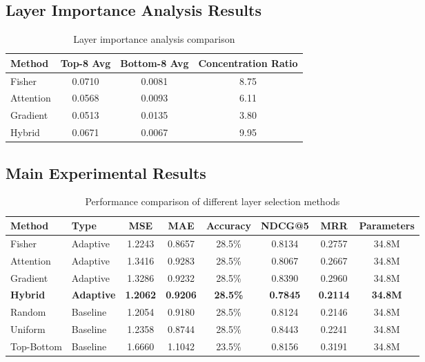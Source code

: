 \documentclass[sigconf]{acmart}
\begin{document}
\subsection{Layer Importance Analysis Results}

\begin{table}[htbp]
\centering
\caption{Layer importance analysis comparison}
\begin{tabular}{lccc}
\toprule
Method & Top-8 Avg & Bottom-8 Avg & Concentration Ratio \\
\midrule
Fisher & 0.0710 & 0.0081 & 8.75 \\
Attention & 0.0568 & 0.0093 & 6.11 \\
Gradient & 0.0513 & 0.0135 & 3.80 \\
Hybrid & 0.0671 & 0.0067 & 9.95 \\
\bottomrule
\end{tabular}
\label{tab:layer_importance}
\end{table}

\subsection{Main Experimental Results}

\begin{table*}[htbp]
\centering
\caption{Performance comparison of different layer selection methods}
\begin{tabular}{llcccccc}
\toprule
Method & Type & MSE & MAE & Accuracy & NDCG@5 & MRR & Parameters \\
\midrule
Fisher & Adaptive & 1.2243 & 0.8657 & 28.5\% & 0.8134 & 0.2757 & 34.8M \\
Attention & Adaptive & 1.3416 & 0.9283 & 28.5\% & 0.8067 & 0.2667 & 34.8M \\
Gradient & Adaptive & 1.3286 & 0.9232 & 28.5\% & 0.8390 & 0.2960 & 34.8M \\
\textbf{Hybrid} & \textbf{Adaptive} & \textbf{1.2062} & \textbf{0.9206} & \textbf{28.5\%} & \textbf{0.7845} & \textbf{0.2114} & \textbf{34.8M} \\
Random & Baseline & 1.2054 & 0.9180 & 28.5\% & 0.8124 & 0.2146 & 34.8M \\
Uniform & Baseline & 1.2358 & 0.8744 & 28.5\% & 0.8443 & 0.2241 & 34.8M \\
Top-Bottom & Baseline & 1.6660 & 1.1042 & 23.5\% & 0.8156 & 0.3191 & 34.8M \\
\bottomrule
\end{tabular}
\label{tab:main_results}
\end{table*}
\end{document}
